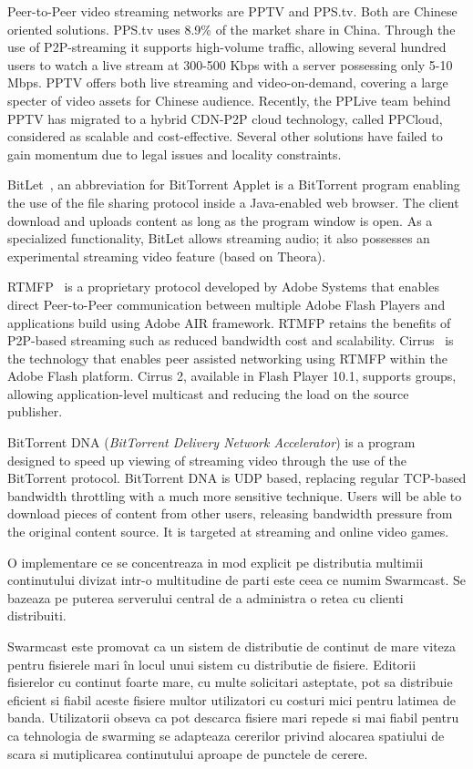Peer-to-Peer video streaming networks are PPTV and PPS.tv. Both are Chinese
oriented solutions. PPS.tv uses 8.9\% of the market share in China. Through
the use of P2P-streaming it supports high-volume traffic, allowing several
hundred users to watch a live stream at 300-500 Kbps with a server possessing
only 5-10 Mbps. PPTV offers both live streaming and video-on-demand, covering
a large specter of video assets for Chinese audience. Recently, the PPLive
team behind PPTV has migrated to a hybrid CDN-P2P cloud technology, called
PPCloud, considered as scalable and cost-effective. Several other solutions
have failed to gain momentum due to legal issues and locality constraints.

BitLet~\cite{bitlet}, an abbreviation for BitTorrent Applet is a BitTorrent
program enabling the use of the file sharing protocol inside a Java-enabled
web browser. The client download and uploads content as long as the program
window is open. As a specialized functionality, BitLet allows streaming audio;
it also possesses an experimental streaming video feature (based on Theora).

RTMFP~\cite{rtmfp} is a proprietary protocol developed by Adobe Systems that
enables direct Peer-to-Peer communication between multiple Adobe Flash Players
and applications build using Adobe AIR framework. RTMFP retains the benefits
of P2P-based streaming such as reduced bandwidth cost and scalability.
Cirrus~\cite{cirrus} is the technology that enables peer assisted networking
using RTMFP within the Adobe Flash platform. Cirrus 2, available in Flash
Player 10.1, supports groups, allowing application-level multicast and
reducing the load on the source publisher.

BitTorrent DNA (\textit{BitTorrent Delivery Network Accelerator}) is a program
designed to speed up viewing of streaming video through the use of the
BitTorrent protocol. BitTorrent DNA is UDP based, replacing regular TCP-based
bandwidth throttling with a much more sensitive technique. Users will be able
to download pieces of content from other users, releasing bandwidth pressure
from the original content source. It is targeted at streaming and online video
games.

O implementare ce se concentreaza in mod explicit pe distributia multimii
continutului divizat intr-o multitudine de parti este ceea ce numim Swarmcast.
Se bazeaza pe puterea serverului central de a administra o retea cu clienti
distribuiti.

Swarmcast este promovat ca un sistem de distributie de continut de mare viteza
pentru fisierele mari în locul unui sistem cu distributie de fisiere. Editorii
fisierelor cu continut foarte mare, cu multe solicitari asteptate, pot sa
distribuie eficient si fiabil aceste fisiere multor utilizatori cu costuri
mici pentru latimea de banda. Utilizatorii obseva ca pot descarca fisiere mari
repede si mai fiabil pentru ca tehnologia de swarming se adapteaza cererilor
privind alocarea spatiului de scara si mutiplicarea continutului aproape de
punctele de cerere.

